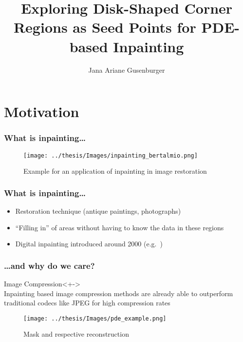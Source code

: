 \documentclass{beamer}
\title[Corner Region Inpainting]{Exploring Disk-Shaped Corner Regions as Seed Points for PDE-based Inpainting}
\author{Jana Ariane Gusenburger}
\begin{document}
\begin{frame}[t]
        \titlepage
\end{frame}


    \section{Motivation}
    \begin{frame}[t]
        \frametitle{What is inpainting\dots}
        \begin{figure}
            \centering
            \texttt{[image: ../thesis/Images/inpainting\_bertalmio.png]}
            \caption{Example for an application of inpainting in image
            restoration~\cite{bertalmio00}}
        \end{figure}
    \end{frame}

    \begin{frame}[t]
        \frametitle{What is inpainting\dots}
        \begin{itemize}[<+-|alert@+>]
            \item Restoration technique (antique paintings, photographs)
            \item ``Filling in'' of areas without having to know the data in these regions
            \item Digital inpainting introduced around 2000 (e.g.~\cite{bertalmio00, masnou98})
        \end{itemize}
    \end{frame}


    \begin{frame}[t]
        \frametitle{\dots and why do we care?}
        \begin{block}{Image Compression}<+->\ \\
            Inpainting based image compression methods are already able to outperform traditional
            codecs like JPEG for high compression rates
        \end{block}
         {
            \begin{figure}
                \centering
                \texttt{[image: ../thesis/Images/pde\_example.png]}
            \caption{Mask and respective reconstruction~\cite{hoeltgen12}}
            \end{figure}
        }
    \end{frame}
\end{document}
